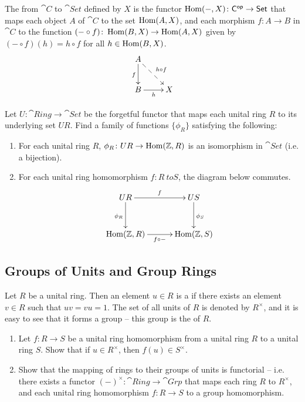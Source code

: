 The  from $\cat C$ to $\cat{Set}$ defined by $X$ is the functor $\operatorname{Hom}(-, X) \colon \mathsf{C}^\mathsf{op} \to \mathsf{Set}$ that maps each object $A$ of $\cat C$ to the set $\operatorname{Hom}(A, X)$, and each morphism $f \colon A \to B$ in $\cat C$ to the function $(- \circ f) \colon \operatorname{Hom}(B, X) \to \operatorname{Hom}(A, X)$ given by $(- \circ f)(h) = h \circ f$ for all $h \in \operatorname{Hom}(B, X)$.
\begin{equation*}
\xymatrix{
A \ar[d]_f \ar@{-->}[rd]^{h \circ f} & \\
B \ar[r]_h & X
}
\end{equation*}

\begin{Exercise}
Let $U \colon \cat{Ring} \to \cat{Set}$ be the forgetful functor that maps each unital ring $R$ to its underlying set $UR$. Find a family of functions $\{\phi_R\}$ satisfying the following:
\begin{enumerate}[label = (\roman*)]
\item For each unital ring $R$, $\phi_R \colon UR \to \operatorname{Hom}(\mathbb Z, R)$ is an isomorphism in $\cat{Set}$ (i.e. a bijection).
\item For each unital ring homomorphism $f \colon R\ to S$, the diagram below commutes.
\begin{equation*}
\xymatrix@=3em{
UR \ar[r]^f \ar[d]_{\phi_R} & US \ar[d]^{\phi_S} \\
\Hom(\mathbb Z, R) \ar[r]_{f \circ -} & \Hom(\mathbb Z, S)
}
\end{equation*}
\end{enumerate}
\end{Exercise}

\subsection*{Groups of Units and Group Rings}

Let $R$ be a unital ring. Then an element $u \in R$ is a  if there exists an element $v \in R$ such that $uv = vu = 1$. The set of all units of $R$ is denoted by $R^\times$, and it is easy to see that it forms a group -- this group is the  of $R$.

\begin{Exercise}
\begin{enumerate}
\item Let $f \colon R \to S$ be a unital ring homomorphism from a unital ring $R$ to a unital ring $S$. Show that if $u \in R^\times$, then $f(u) \in S^\times$.
\item Show that the mapping of rings to their groups of units is functorial -- i.e. there exists a functor $(-)^\times \colon \cat{Ring} \to \cat{Grp}$ that maps each ring $R$ to $R^\times$, and each unital ring homomorphism $f \colon R \to S$ to a group homomorphism.

\end{enumerate}
\end{Exercise}

